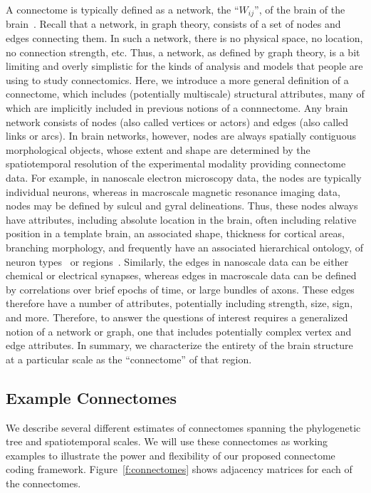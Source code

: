\documentclass[11pt]{article}
\begin{document}
A connectome is typically defined as a network, the ``$W_{ij}$'', of the brain of the brain~\cite{Sporns2005-mg, Hagmann2005-ss}.
Recall that a network, in graph theory, consists of a set of nodes and edges connecting them.  In such a network, there is no physical space, no location, no connection strength, etc.  
Thus, a network, as defined by graph theory,  is a bit limiting and overly simplistic for the kinds of analysis and models that people are using to study connectomics.  
Here, we introduce a more general definition of a connectome, which includes (potentially multiscale)   structural attributes, many of which are implicitly included in previous notions of a connnectome.
Any brain network consists of nodes (also called vertices or actors) and edges (also called links or arcs).  
In brain networks, however, nodes are always spatially contiguous morphological objects, whose extent and shape are determined by the spatiotemporal resolution of the experimental modality providing connectome data.  For example, in nanoscale electron microscopy data, the nodes are typically individual neurons, whereas in macroscale magnetic resonance imaging data, nodes may be defined by sulcul and gyral delineations.
Thus, these nodes always have attributes, including absolute location in the brain, often including relative position in a template brain, an associated shape, thickness for cortical areas, branching morphology, and frequently have an associated  hierarchical ontology, of neuron types~\cite{Hodge2018-dr}  or regions~\cite{Hagmann2008-ml, Mai2007-wq}.
Similarly, the edges in nanoscale data can be either chemical or electrical synapses, whereas edges in macroscale data can be defined by correlations over brief epochs of time, or large bundles of axons. 
These edges therefore have a number of attributes, potentially including strength, size, sign, and more.   Therefore, to answer the questions of interest requires a generalized notion of a network or graph, one that includes potentially complex vertex and edge attributes. In summary, we characterize the entirety of the brain structure at a particular scale as the ``connectome'' of that region. 




\subsection{Example Connectomes}
\label{s:examples}

We describe several different estimates of connectomes spanning the phylogenetic tree and spatiotemporal scales.  We will use these connectomes as working examples  to illustrate the power and flexibility of our proposed connectome coding framework. Figure~\ref{f:connectomes} shows adjacency matrices for each of the connectomes.
\end{document}
